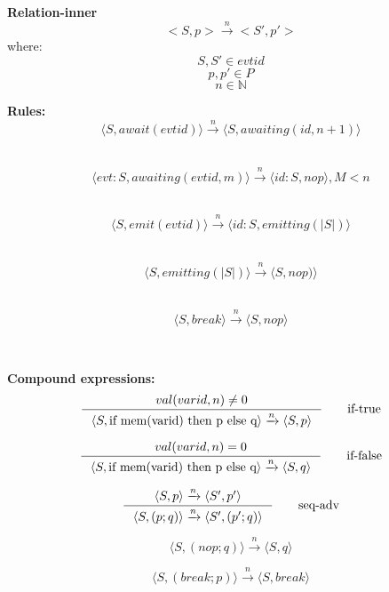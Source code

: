 \documentclass[9pt]{article}
\newcommand{\la}{\langle}
\newcommand{\ra}{\rangle}
\newcommand{\xra}[1]{\xrightarrow{#1}}
\begin{document}
\textbf{Relation-inner}
\[
  {<S,p> \xra{n} <S',p'>}
\]
where:
\[
  S,S' \in evtid   \tag*{(sequence of event identifiers)}
\]
\[
  p,p' \in P       \tag*{(programs following the abstract syntax)}
\]
\[
  n \in \mathbb{N} \tag*{(unique identifier for the reaction chain)}
\]

\textbf{Rules:}
\[
  \la S, await(evtid)\ra \xra{n} \la S, awaiting(id, n+1)\ra \tag*{(await)}
\]

~
\[
  \la evt:S, awaiting(evtid, m)\ra \xra{n} \la id:S, nop\ra, M < n \tag*{(awake)}
\]

~
\[
  \la S, emit(evtid)\ra \xra{n} \la id:S, emitting(|S|)\ra \tag*{(emit)}
\]

~
\[
  \la S, emitting(|S|)\ra \xra{n} \la S, nop)\ra \tag*{(pop)}
\]

~
\[
  \la S, break \ra \xra{n} \la S, nop\ra
    \tag *{break}
\]

~

\textbf{Compound expressions:}
\[
  \inference{val(varid,n)\ne0}
            {\la S, \textrm{if mem(varid) then p else q}\ra \xra{n} \la S, p\ra}
            \tag*{if-true}
\]

\[
  \inference{val(varid,n)=0}
            {\la S, \textrm{if mem(varid) then p else q}\ra \xra{n} \la S, q\ra}
            \tag*{if-false}
\]

\[
  \inference{\la S, p\ra \xra{n} \la S', p'\ra}
            {\la S, (p ; q)\ra \xra{n} \la S', (p' ; q)\ra}
            \tag*{seq-adv}
\]

\[
  \la S, (nop ; q)\ra \xra{n} \la S, q\ra
    \tag*{seq-nop}
\]

\[
  \la S, (break ; p)\ra \xra{n} \la S, break\ra
    \tag*{break-seq}
\]
\end{document}
